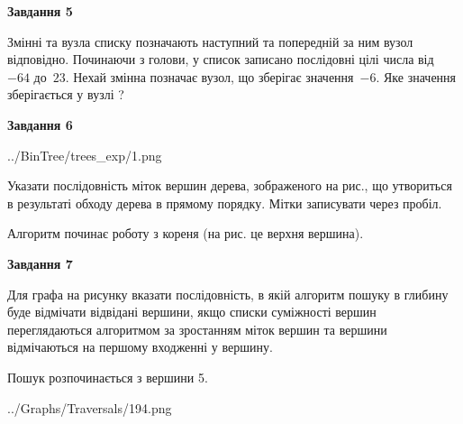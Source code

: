 \documentclass[12pt, ukrainian]{article}
\begin{document}
{\begin {large}
{\begin {center}\textbf{Завдання 5}\end {center}}\par
Змінні  та  вузла списку позначають наступний та попередній за ним вузол відповідно. Починаючи з голови, у список записано послідовні цілі числа від~$-64$ до~$23$. Нехай змінна  позначає вузол, що зберігає значення~$-6$.
Яке значення зберігається у вузлі  ?\par
\newpage

{\begin {center}\textbf{Завдання 6}\end {center}}\par

\begin{center}
	{../BinTree/trees_exp/1.png}
\end{center}
Указати послідовність міток вершин дерева, зображеного на рис., що утвориться в результаті обходу дерева в прямому порядку. Мітки записувати через пробіл.\par Алгоритм починає роботу з кореня (на рис. це верхня вершина).\par
\newpage

{\begin {center}\textbf{Завдання 7}\end {center}}\par
Для графа на рисунку вказати послідовність, в якій алгоритм пошуку в глибину буде відмічати відвідані вершини, якщо списки суміжності вершин переглядаються алгоритмом за зростанням міток вершин та вершини відмічаються на першому вход\-женні у вершину.\par
Пошук розпочинається з вершини 5.\par

\begin{center}
	{../Graphs/Traversals/194.png}
\end{center}\par
\newpage


\end{large}}
\end{document}
